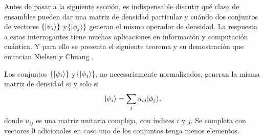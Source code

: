 Antes de pasar a la siguiente sección, es indispensable discutir qué clase de ensambles pueden dar una matriz de densidad particular y cuándo dos conjuntos de vectores $\{|\psi_i\rangle\}$ y$ \{|\phi_j\rangle \}$ generan el mismo operador de densidad. La respuesta a estas interrogantes tiene muchas aplicaciones en información y computación cuántica. Y para ello se presenta el siguiente teorema y su demostración que enuncian Nielsen y Chuang {\cite{nielsen_chuang_2010}}. \begin{theorem}
Los conjuntos $\{|\psi_i\rangle\}$ y$ \{|\phi_j\rangle \}$, no necesariamente normalizados, generan la misma matriz de densidad si y solo si \begin{equation}\label{teorema2.4}
|\psi_i\rangle= \sum_{j}u_{ij}|\phi_j\rangle,
\end{equation} donde $u_{ij}$ es una matriz unitaria compleja, con índices $i$ y $j$. Se completa con vectores 0 adicionales en caso uno de los conjuntos tenga menos elementos.
\end{theorem}

